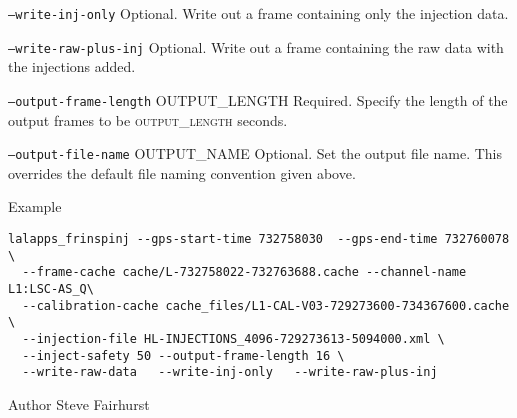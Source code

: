 \begin{entry}
\begin{entry}
\item[\texttt{--write-inj-only}]  Optional.  Write out a frame
containing only the injection data.

\item[\texttt{--write-raw-plus-inj}]  Optional.  Write out a frame
containing the raw data with the injections added.
  
\item[\texttt{--output-frame-length} \textsc{OUTPUT\_LENGTH}]  Required.
Specify the length of the output frames to be \textsc{output\_length}
seconds.

\item[\texttt{--output-file-name} \textsc{OUTPUT\_NAME} ] Optional.
Set the output file name.  This overrides the default file naming
convention given above.

\end{entry}


\item[Example]
\begin{verbatim}
lalapps_frinspinj --gps-start-time 732758030  --gps-end-time 732760078 \
  --frame-cache cache/L-732758022-732763688.cache --channel-name L1:LSC-AS_Q\	
  --calibration-cache cache_files/L1-CAL-V03-729273600-734367600.cache \
  --injection-file HL-INJECTIONS_4096-729273613-5094000.xml \
  --inject-safety 50 --output-frame-length 16 \
  --write-raw-data   --write-inj-only   --write-raw-plus-inj 
\end{verbatim}

\item[Author] 
Steve Fairhurst
\end{entry}

